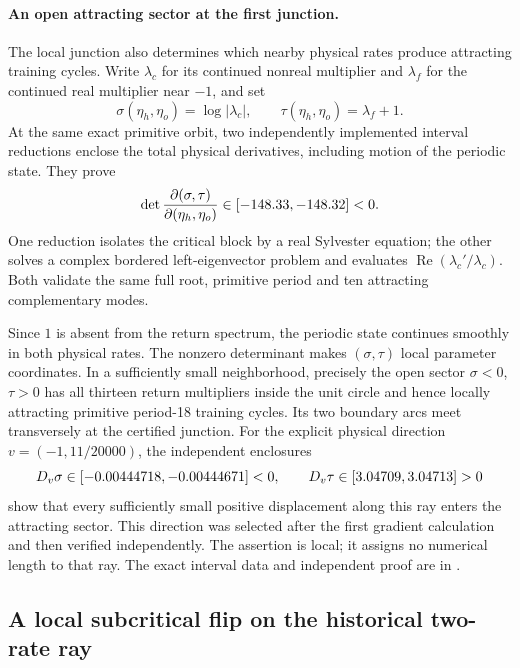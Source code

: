 \documentclass[11pt,letterpaper]{article}
\begin{document}
\paragraph{An open attracting sector at the first junction.}
The local junction also determines which nearby physical rates produce attracting
training cycles. Write $\lambda_c$ for its continued nonreal multiplier and
$\lambda_f$ for the continued real multiplier near $-1$, and set
\begin{equation}
 \sigma(\eta_h,\eta_o)=\log|\lambda_c|,\qquad
 \tau(\eta_h,\eta_o)=\lambda_f+1.
\end{equation}
At the same exact primitive orbit, two independently implemented interval
reductions enclose the total physical derivatives, including motion of the
periodic state. They prove
\begin{equation}
 \det\frac{\partial(\sigma,\tau)}{\partial(\eta_h,\eta_o)}
 \in[-148.33, -148.32]<0.
\end{equation}
One reduction isolates the critical block by a real Sylvester equation; the
other solves a complex bordered left-eigenvector problem and evaluates
$\operatorname{Re}(\lambda_c'/\lambda_c)$. Both validate the same full root,
primitive period and ten attracting complementary modes.

Since $1$ is absent from the return spectrum, the periodic state continues
smoothly in both physical rates. The nonzero determinant makes $(\sigma,\tau)$
local parameter coordinates. In a sufficiently small neighborhood, precisely
the open sector $\sigma<0$, $\tau>0$ has all thirteen return multipliers inside
the unit circle and hence locally attracting primitive period-18 training
cycles. Its two boundary arcs meet transversely at the certified junction.
For the explicit physical direction $v=(-1,11/20000)$, the independent enclosures
\begin{equation}
 D_v\sigma\in[-0.00444718, -0.00444671]<0,\qquad
 D_v\tau\in[3.04709, 3.04713]>0
\end{equation}
show that every sufficiently small positive displacement along this ray enters
the attracting sector. This direction was selected after the first gradient
calculation and then verified independently. The assertion is local; it assigns
no numerical length to that ray. The exact interval data and independent proof
are in .

\subsection{A local subcritical flip on the historical two-rate ray}
\label{sec:flip-proof}
\end{document}
